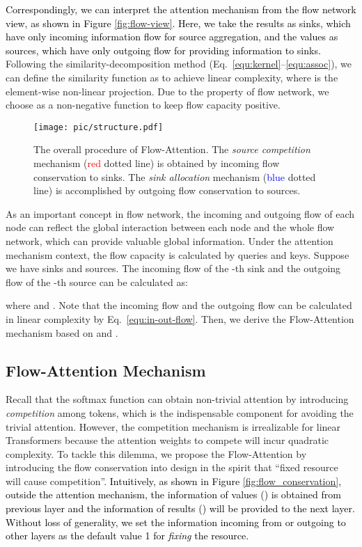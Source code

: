 \documentclass[nohyperref]{article}
\theoremstyle{plain}
\theoremstyle{definition}
\theoremstyle{remark}
\newcommand{\update}[1]{{\textcolor{black}{#1}}}
\begin{document}
\update{Correspondingly, we can interpret the attention mechanism from the flow network view, as shown in Figure \ref{fig:flow-view}. Here, we take the results  as sinks, which have only incoming information flow for source aggregation, and the values  as sources, which have only outgoing flow for providing information to sinks.} Following the similarity-decomposition method (Eq.~\eqref{equ:kernel}--\eqref{equ:assoc}), we can define the similarity function  as  to achieve linear complexity, where  is the element-wise non-linear projection. Due to the property of flow network, we choose  as a non-negative function to keep flow capacity positive.

\begin{figure*}[t]
\begin{center}
	\centerline{\texttt{[image: pic/structure.pdf]}}
	\caption{The overall procedure of Flow-Attention. The \emph{source competition} mechanism (\textcolor{red}{red} dotted line) is obtained by incoming flow conservation to sinks. The \emph{sink allocation} mechanism (\textcolor{blue}{blue} dotted line) is accomplished by outgoing flow conservation to sources. }
	\label{fig:overall}
\end{center}
\vspace{-5pt}
\end{figure*}

As an important concept in flow network, the incoming and outgoing flow of each node can reflect the global interaction between each node and the whole flow network, which can provide valuable global information. Under the attention mechanism context, the flow capacity is calculated by queries and keys. Suppose we have  sinks and  sources. The incoming flow  of the -th sink and the outgoing flow  of the -th source can be calculated as:

where  and . Note that the incoming flow  and the outgoing flow  can be calculated in linear complexity by Eq.~\eqref{equ:in-out-flow}. Then, we derive the Flow-Attention mechanism based on  and .


\subsection{Flow-Attention Mechanism}

Recall that the softmax function can obtain non-trivial attention by introducing \emph{competition} among tokens, which is the indispensable component for avoiding the trivial attention. However, the competition mechanism is irrealizable for linear Transformers because the attention weights to compete will incur quadratic complexity. To tackle this dilemma, we propose the Flow-Attention by introducing the flow conservation into design in the spirit that ``fixed resource will cause competition''. \update{Intuitively, as shown in Figure \ref{fig:flow_conservation}, outside the attention mechanism, the information of values () is obtained from previous layer and the information of results () will be provided to the next layer. Without loss of generality, we set the information incoming from or outgoing to other layers as the default value 1 for \emph{fixing} the resource.}
\end{document}
